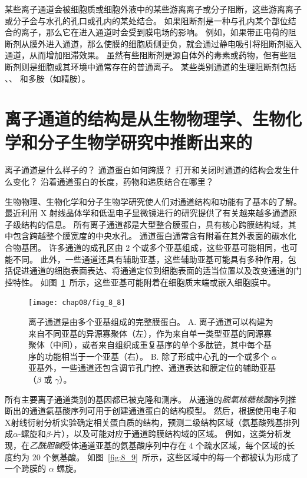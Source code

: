 某些离子通道会被细胞质或细胞外液中的某些游离离子或分子阻断，这些游离离子或分子会与水孔的孔口或孔内的某处结合。
如果阻断剂是一种与孔内某个部位结合的离子，那么它在进入通道时会受到膜电场的影响。
例如，如果带正电荷的阻断剂从膜外进入通道，那么使膜的细胞质侧更负，就会通过静电吸引将阻断剂驱入通道，从而增加阻滞效果。
虽然有些阻断剂是源自体外的毒素或药物，但有些阻断剂则是细胞或其环境中通常存在的普通离子。
某些类别通道的生理阻断剂包括 、、 和多胺（如精胺）。



\section{离子通道的结构是从生物物理学、生物化学和分子生物学研究中推断出来的}

离子通道是什么样子的？
通道蛋白如何跨膜？
打开和关闭时通道的结构会发生什么变化？
沿着通道蛋白的长度，药物和递质结合在哪里？


生物物理、生物化学和分子生物学研究使人们对通道结构和功能有了基本的了解。
最近利用 X 射线晶体学和低温电子显微镜进行的研究提供了有关越来越多通道原子级结构的信息。
所有离子通道都是大型整合膜蛋白，具有核心跨膜结构域，其中包含跨越整个膜宽度的中央水孔。
通道蛋白通常含有附着在其外表面的碳水化合物基团。
许多通道的成孔区由 2 个或多个亚基组成，这些亚基可能相同，也可能不同。
此外，一些通道还具有辅助亚基，这些辅助亚基可能具有多种作用，包括促进通道的细胞表面表达、将通道定位到细胞表面的适当位置以及改变通道的门控特性。
如图~\ref{fig:8_8}~所示，这些亚基可能附着在细胞质末端或嵌入细胞膜中。


\begin{figure}[htbp]
	\centering
	\texttt{[image: chap08/fig\_8\_8]}
	\caption{离子通道是由多个亚基组成的完整膜蛋白。
		A. 离子通道可以构建为来自不同亚基的异源寡聚体（左），作为来自单一类型亚基的同源寡聚体（中间），或者来自组织成重复基序的单个多肽链，其中每个基序的功能相当于一个亚基（右）。
		B. 除了形成中心孔的一个或多个 $\alpha$ 亚基外，一些通道还包含调节孔门控、通道表达和膜定位的辅助亚基（$\beta$ 或 $\gamma$）。}
	\label{fig:8_8}
\end{figure}


所有主要离子通道类别的基因都已被克隆和测序。
从通道的\textit{脱氧核糖核酸}序列推断出的通道氨基酸序列可用于创建通道蛋白的结构模型。
然后，根据使用电子和X射线衍射分析实验确定相关蛋白质的结构，预测二级结构区域（氨基酸残基排列成$\alpha$-螺旋和$\beta$-片），以及可能对应于通道跨膜结构域的区域。
例如，这类分析发现，在\textit{乙酰胆碱}受体通道亚基的氨基酸序列中存在 4 个疏水区域，每个区域的长度约为 20 个氨基酸。
如图~\ref{fig:8_9}~所示，这些区域中的每一个都被认为形成了一个跨膜的 $\alpha$ 螺旋。


